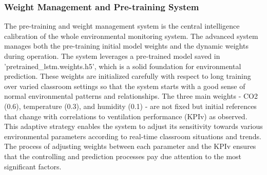
\subsubsection{Weight Management and Pre-training System}
The pre-training and weight management system is the central intelligence calibration of the whole environmental monitoring system. The advanced system manages both the pre-training initial model weights and the dynamic weights during operation. The system leverages a pre-trained model saved in 'pretrained\_lstm.weights.h5', which is a solid foundation for environmental prediction. These weights are initialized carefully with respect to long training over varied classroom settings so that the system starts with a good sense of normal environmental patterns and relationships. The three main weights - CO2 (0.6), temperature (0.3), and humidity (0.1) - are not fixed but initial references that change with correlations to ventilation performance (KPIv) as observed. This adaptive strategy enables the system to adjust its sensitivity towards various environmental parameters according to real-time classroom situations and trends. The process of adjusting weights between each parameter and the KPIv ensures that the controlling and prediction processes pay due attention to the most significant factors.

